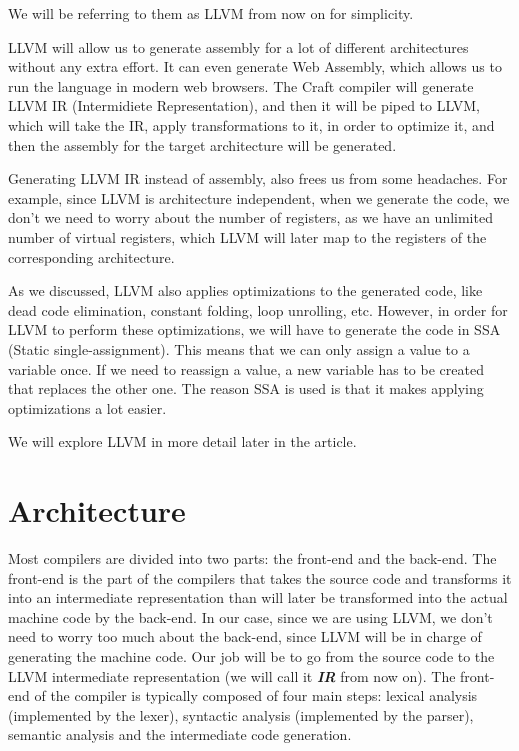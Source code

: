 ﻿\documentclass[10pt,a4paper,twocolumn,twoside]{article}
\begin{document}
We will be referring to 
them as LLVM from now on for simplicity. 

LLVM will allow us to generate assembly for a lot of different architectures
without any extra effort. It can even generate Web Assembly, which allows us to
run the language in modern web browsers. The Craft compiler will generate LLVM
IR (Intermidiete Representation), and then it will be piped to LLVM, which will
take the IR, apply transformations to it, in order to optimize it, and then
the assembly for the target architecture will be generated.

Generating LLVM IR instead of assembly, also frees us from some headaches. For
example, since LLVM is architecture independent, when we generate the code, we
don't we need to worry about the number of registers, as we have an unlimited
number of virtual registers, which LLVM will later map to the registers of the
corresponding architecture.

As we discussed, LLVM also applies optimizations to the generated code, like
dead code elimination, constant folding, loop unrolling, etc. However, in order
for LLVM to perform these optimizations, we will have to generate the code in
SSA (Static single-assignment). This means that we can only assign a value to a
variable once. If we need to reassign a value, a new variable has to be created
that replaces the other one. The reason SSA is used is that it makes applying
optimizations a lot easier.

We will explore LLVM in more detail later in the article.

\section{Architecture}
Most compilers are divided into two parts: the front-end and the back-end. The
front-end is the part of the compilers that takes the source code and transforms
it into an intermediate representation than will later be transformed into the
actual machine code by the back-end. In our case, since we are using LLVM, we
don't need to worry too much about the back-end, since LLVM will be in charge of
generating the machine code. Our job will be to go from the source code to the
LLVM intermediate representation (we will call it \textbf{\textit{IR}} from now
on). The front-end of the compiler is typically composed of four main steps:
lexical analysis (implemented by the lexer), syntactic analysis (implemented by
the parser), semantic analysis and the intermediate code generation.
\end{document}

